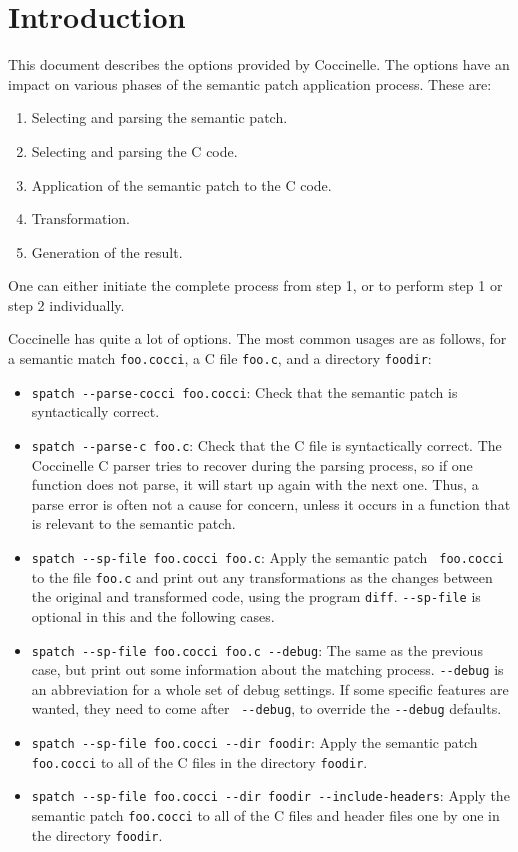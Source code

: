 \section{Introduction}

This document describes the options provided by Coccinelle.  The options
have an impact on various phases of the semantic patch application
process.  These are:

\begin{enumerate}
\item Selecting and parsing the semantic patch.
\item Selecting and parsing the C code.
\item Application of the semantic patch to the C code.
\item Transformation.
\item Generation of the result.
\end{enumerate}

\noindent
One can either initiate the complete process from step 1, or
to perform step 1 or step 2 individually.

Coccinelle has quite a lot of options.  The most common usages are as
follows, for a semantic match {\tt foo.cocci}, a C file {\tt foo.c}, and a
directory {\tt foodir}:

\begin{itemize}
\item {\tt spatch -{}-parse-cocci foo.cocci}: Check that the semantic patch
  is syntactically correct.
\item {\tt spatch -{}-parse-c foo.c}: Check that the C file
  is syntactically correct.  The Coccinelle C parser tries to recover
  during the parsing process, so if one function does not parse, it will
  start up again with the next one.  Thus, a parse error is often not a
  cause for concern, unless it occurs in a function that is relevant to the
  semantic patch.
\item {\tt spatch -{}-sp-file foo.cocci foo.c}: Apply the semantic patch {\tt
    foo.cocci} to the file {\tt foo.c} and print out any transformations as
  the changes between the original and transformed code, using the program
  {\tt diff}.  {\tt -{}-sp-file} is optional in this and the following cases.
\item {\tt spatch -{}-sp-file foo.cocci foo.c -{}-debug}:  The same as the
  previous case, but print out some information about the matching process.
  {\tt -{}-debug} is an abbreviation for a whole set of debug settings.  If
  some specific features are wanted, they need to come after {\tt
    -{}-debug}, to override the {\tt -{}-debug} defaults.
\item {\tt spatch -{}-sp-file foo.cocci -{}-dir foodir}:  Apply the semantic
  patch {\tt foo.cocci} to all of the C files in the directory {\tt foodir}.
\item {\tt spatch -{}-sp-file foo.cocci -{}-dir foodir -{}-include-headers}:  Apply
  the semantic patch {\tt foo.cocci} to all of the C files and header files
  one by one in the directory {\tt foodir}.
\end{itemize}

